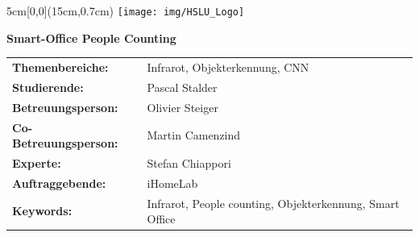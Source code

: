\documentclass[
	a4paper
]{scrartcl}
\begin{document}

\begin{textblock*}{5cm}[0,0](15cm,0.7cm)
	\texttt{[image: img/HSLU\_Logo]}
\end{textblock*}

\vspace*{2cm}

\noindent

\centerline{\textbf{\LARGE{Smart-Office People Counting}}} 


\vspace{2em}
\bgroup
\setlength\tabcolsep{0cm}

\begin{large}
\noindent
\begin{tabularx}{\textwidth}{p{5cm}X}
	\textbf{Themenbereiche:} & Infrarot, Objekterkennung, CNN\\
	\textbf{Studierende:} & Pascal Stalder\\
	\textbf{Betreuungsperson:} & Olivier Steiger\\
	\textbf{Co-Betreuungsperson:} & Martin Camenzind\\
	\textbf{Experte:} & Stefan Chiappori\\
	\textbf{Auftraggebende:} & iHomeLab\\
	\textbf{Keywords:} & Infrarot, People counting, Objekterkennung, Smart Office\\
\end{tabularx}
\end{large}
\egroup
\end{document}
